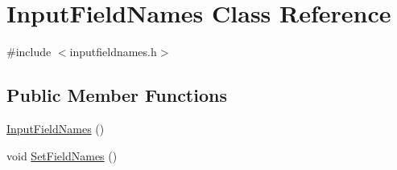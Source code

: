 \hypertarget{classInputFieldNames}{\section{Input\-Field\-Names Class Reference}
\label{classInputFieldNames}
}


{\ttfamily \#include $<$inputfieldnames.\-h$>$}

\subsection*{Public Member Functions}
\begin{DoxyCompactItemize}
\item 
\hyperlink{classInputFieldNames_a45053e8155519fdcd8218b7c6d51803c}{Input\-Field\-Names} ()
\item 
void \hyperlink{classInputFieldNames_a7f9413e1474a83378a2e29f0ceee4311}{Set\-Field\-Names} ()
\end{DoxyCompactItemize}
